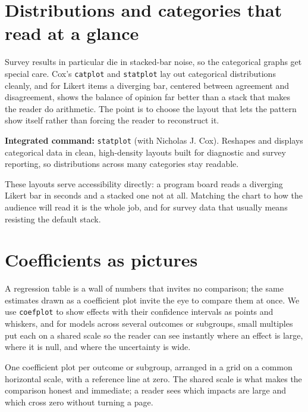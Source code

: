 \documentclass[
    a4paper,
    fontsize=10pt,
    twoside=true,
    numbers=noenddot,
]{kaobook}
\newenvironment{vizcallout}[1][Visualization to build]{%
    \begin{vizbox}[frametitle={#1}]%
}{%
    \end{vizbox}%
}
\begin{document}
\section{Distributions and categories that read at a glance}
Survey results in particular die in stacked-bar noise, so the categorical graphs get special care. Cox's \texttt{catplot} and \texttt{statplot} lay out categorical distributions cleanly, and for Likert items a diverging bar, centered between agreement and disagreement, shows the balance of opinion far better than a stack that makes the reader do arithmetic. The point is to choose the layout that lets the pattern show itself rather than forcing the reader to reconstruct it.

\begin{kaobox}[frametitle=Package Integration: \texttt{statplot}]
\textbf{Integrated command:} \texttt{statplot} (with Nicholas J. Cox). Reshapes and displays categorical data in clean, high-density layouts built for diagnostic and survey reporting, so distributions across many categories stay readable.
\end{kaobox}

These layouts serve accessibility directly: a program board reads a diverging Likert bar in seconds and a stacked one not at all. Matching the chart to how the audience will read it is the whole job, and for survey data that usually means resisting the default stack.

\section{Coefficients as pictures}
A regression table is a wall of numbers that invites no comparison; the same estimates drawn as a coefficient plot invite the eye to compare them at once. We use \texttt{coefplot} to show effects with their confidence intervals as points and whiskers, and for models across several outcomes or subgroups, small multiples put each on a shared scale so the reader can see instantly where an effect is large, where it is null, and where the uncertainty is wide.

\begin{vizcallout}[Visualization to build: the small-multiple coefficient plot]
One coefficient plot per outcome or subgroup, arranged in a grid on a common horizontal scale, with a reference line at zero. The shared scale is what makes the comparison honest and immediate; a reader sees which impacts are large and which cross zero without turning a page.
\end{vizcallout}
\end{document}
